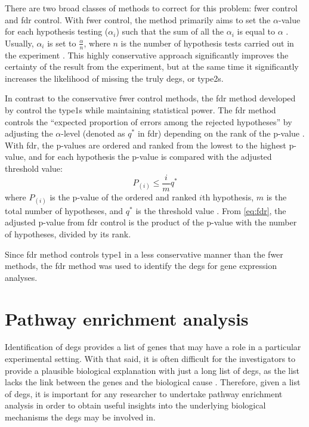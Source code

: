 There are two broad classes of methods to correct for this problem: \gls{fwer} control and \gls{fdr} control.
With \gls{fwer} control, the method primarily aims to set the $\alpha$-value for each hypothesis testing ($\alpha_i$) such that the sum of all the $\alpha_i$ is equal to $\alpha$ \citep{Hochberg1987,Shaffer1995}.
Usually, $\alpha_i$ is set to $\frac{\alpha}{n}$, where $n$ is the number of hypothesis tests carried out in the experiment \citep{Shaffer1995}.
This highly conservative approach significantly improves the certainty of the result from the experiment, but at the same time it significantly increases the likelihood of missing the truly \glspl{deg}, or \glspl{type2}.

In contrast to the conservative \gls{fwer} control methods, the \gls{fdr} method developed by \citet{Benjamini1995a} control the \glspl{type1} while maintaining statistical \gls{power}.
The \gls{fdr} method controls the ``expected proportion of errors among the rejected hypotheses'' by adjusting the $\alpha$-level (denoted as $q^*$ in \gls{fdr}) depending on the rank of the p-value \citep{Benjamini1995a}.
With \gls{fdr}, the p-values are ordered and ranked from the lowest to the highest p-value, and for each hypothesis the p-value is compared with the adjusted threshold value:
\begin{equation}
	\label{eq:fdr}
	P_{(i)} \leq \frac{i}{m}q^*
\end{equation}
where $P_{(i)}$ is the p-value of the ordered and ranked $i$th hypothesis, $m$ is the total number of hypotheses, and $q^*$ is the threshold value \citep{Benjamini1995a}.
From \cref{eq:fdr}, the adjusted p-value from \gls{fdr} control is the product of the p-value with the number of hypotheses, divided by its rank.

Since \gls{fdr} method controls \gls{type1} in a less conservative manner than the \gls{fwer} methods, the \gls{fdr} method was used to identify the \glspl{deg} for gene expression analyses.

\section{Pathway enrichment analysis}
\label{sec:pathway_enrichment_analysis}

Identification of \glspl{deg} provides a list of genes that may have a role in a particular experimental setting.
With that said, it is often difficult for the investigators to provide a plausible biological explanation with just a long list of \glspl{deg}, as the list lacks the link between the genes and the biological cause \citep{Khatri2012}.
Therefore, given a list of \glspl{deg}, it is important for any researcher to undertake pathway enrichment analysis in order to obtain useful insights into the underlying biological mechanisms the \glspl{deg} may be involved in.

